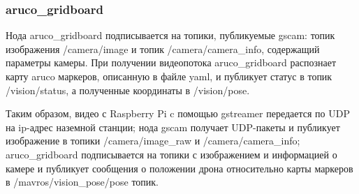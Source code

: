 \subsubsection{aruco\_gridboard}
Нода aruco\_gridboard подписывается на топики, публикуемые gscam: топик изображения /camera/image и топик /camera/camera\_info, содержащий параметры камеры. При получении видеопотока aruco\_gridboard распознает карту aruco маркеров, описанную в файле yaml, и публикует статус в топик /vision/status, а полученные координаты в /vision/pose.

Таким образом, видео с Raspberry Pi c помощью gstreamer передается по UDP на ip-адрес наземной станции; нода gscam получает UDP-пакеты и публикует изображение в топики /camera/image\_raw и /camera/camera\_info; aruco\_gridboard подписывается на топики с изображением и информацией о камере и публикует сообщения о положении дрона относительно карты маркеров в /mavros/vision\_pose/pose топик.

